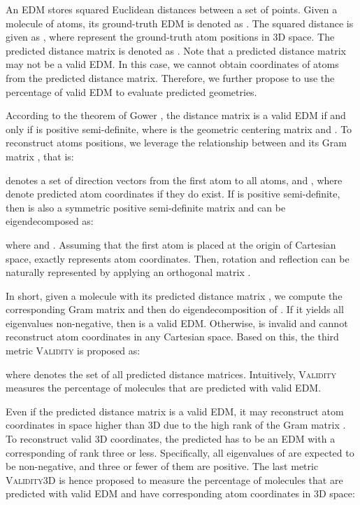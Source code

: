 \documentclass{article}
\begin{document}
An EDM stores squared Euclidean distances between a set of points. Given a molecule of  atoms, its ground-truth EDM is denoted as . The squared distance is given as , where  represent the ground-truth atom positions in 3D space. The predicted distance matrix is denoted as . Note that a predicted distance matrix may not be a valid EDM. In this case, we cannot obtain coordinates of atoms from the predicted distance matrix. Therefore, we further propose to use the percentage of valid EDM to evaluate predicted geometries.



According to the theorem of Gower \cite{gower1982euclidean}, the distance matrix  is a valid EDM if and only if  is positive semi-definite, where  is the geometric centering matrix and . To reconstruct atoms positions, we leverage the relationship between  and its Gram matrix , that is:

 denotes a set of direction vectors from the first atom to all atoms, and , where  denote predicted atom coordinates if they do exist. If  is positive semi-definite, then  is also a symmetric positive semi-definite matrix and can be eigendecomposed as:
 
where  and . Assuming that the first atom is placed at the origin of Cartesian space,  exactly represents atom coordinates. Then, rotation and reflection can be naturally represented by applying an orthogonal matrix . 

In short, given a molecule with its predicted distance matrix , we compute the corresponding Gram matrix  and then do eigendecomposition of . If it yields all eigenvalues non-negative, then  is a valid EDM. Otherwise,  is invalid and cannot reconstruct atom coordinates in any Cartesian space. Based on this, the third metric \textsc{Validity} is proposed as:

where  denotes the set of all predicted distance matrices. Intuitively, \textsc{Validity} measures the percentage of molecules that are predicted with valid EDM. 

Even if the predicted distance matrix is a valid EDM, it may reconstruct atom coordinates in space higher than 3D due to the high rank of the Gram matrix . To reconstruct valid 3D coordinates, the predicted  has to be an EDM with a corresponding  of rank three or less. Specifically, all eigenvalues of  are expected to be non-negative, and three or fewer of them are positive. The last metric \textsc{Validity3D} is hence proposed to measure the percentage of molecules that are predicted with valid EDM and have corresponding atom coordinates in 3D space:
\end{document}
